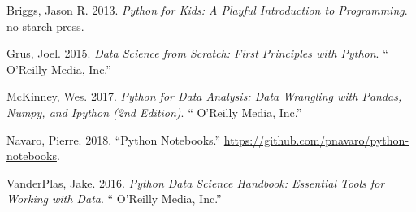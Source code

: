 \documentclass[12pt,]{book}
\numberwithin{equation}{section}
\numberwithin{countremarque}{section}
\begin{document}
\hypertarget{refs}{}
\hypertarget{ref-briggs_2013_python}{}
Briggs, Jason R. 2013. \emph{Python for Kids: A Playful Introduction to
Programming}. no starch press.

\hypertarget{ref-grus_2015_data}{}
Grus, Joel. 2015. \emph{Data Science from Scratch: First Principles with
Python}. `` O'Reilly Media, Inc.''

\hypertarget{ref-mckinney_2017_python}{}
McKinney, Wes. 2017. \emph{Python for Data Analysis: Data Wrangling with
Pandas, Numpy, and Ipython (2nd Edition)}. `` O'Reilly Media, Inc.''

\hypertarget{ref-navaro_python}{}
Navaro, Pierre. 2018. ``Python Notebooks.''
\url{https://github.com/pnavaro/python-notebooks}.

\hypertarget{ref-vanderplas2016python}{}
VanderPlas, Jake. 2016. \emph{Python Data Science Handbook: Essential
Tools for Working with Data}. `` O'Reilly Media, Inc.''
\end{document}
